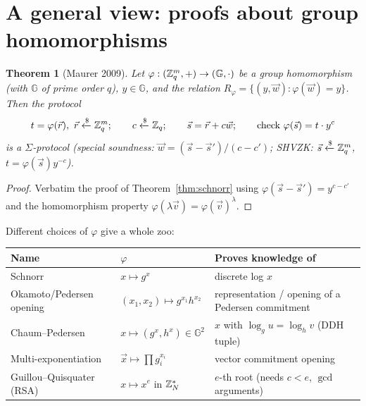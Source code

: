 \documentclass[11pt,a4paper]{report}
\theoremstyle{plain}
\newtheorem{theorem}{Theorem}[chapter]
\theoremstyle{definition}
\theoremstyle{remark}
\newcommand{\GG}{\mathbb{G}}
\newcommand{\getsr}{\xleftarrow{\$}}
\newcommand{\Zs}[1]{\ZZ_{#1}^{*}}
\begin{document}
\section{A general view: proofs about group homomorphisms}
\begin{theorem}[Maurer 2009]\label{thm:maurer}
Let $\varphi:(\ZZ_q^m,+)\to(\GG,\cdot)$ be a group homomorphism (with $\GG$ of prime order $q$), $y\in\GG$, and the relation $R_\varphi=\{(y,\vec w):\varphi(\vec w)=y\}$. Then the protocol
\[
t=\varphi(\vec r),\ \vec r\getsr\ZZ_q^m;\qquad c\getsr\ZZ_q;\qquad \vec s=\vec r+c\vec w;\qquad\text{check }\varphi(\vec s)=t\cdot y^c
\]
is a $\Sigma$-protocol (special soundness: $\vec w=(\vec s-\vec s')/(c-c')$; SHVZK: $\vec s\getsr\ZZ_q^m$, $t=\varphi(\vec s)y^{-c}$).
\end{theorem}
\begin{proof}
Verbatim the proof of Theorem~\ref{thm:schnorr} using $\varphi(\vec s-\vec s')=y^{c-c'}$ and the homomorphism property $\varphi(\lambda\vec v)=\varphi(\vec v)^\lambda$.
\end{proof}
Different choices of $\varphi$ give a whole zoo:
\begin{center}\small
\begin{tabular}{@{}L{3.6cm}L{4.4cm}L{6.6cm}@{}}\toprule
Name & $\varphi$ & Proves knowledge of \\\midrule
Schnorr & $x\mapsto g^x$ & discrete log $x$ \\
Okamoto/Pedersen opening & $(x_1,x_2)\mapsto g^{x_1}h^{x_2}$ & representation / opening of a Pedersen commitment\\
Chaum--Pedersen & $x\mapsto(g^x,h^x)\in\GG^2$ & $x$ with $\log_gu=\log_hv$ (DDH tuple)\\
Multi-exponentiation & $\vec x\mapsto\prod g_i^{x_i}$ & vector commitment opening\\
Guillou--Quisquater (RSA) & $x\mapsto x^e$ in $\Zs N$ & $e$-th root (needs $c<e$, $\gcd$ arguments)\\\bottomrule
\end{tabular}
\end{center}
\end{document}

